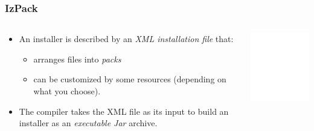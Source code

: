 \documentclass[compress,10pt]{beamer}
\begin{document}
\begin{frame}

\frametitle{IzPack}

\begin{columns}

  \begin{column}{6.5cm}
  \begin{itemize}

    \item An installer is described by an \textsl{XML installation file} that:
      \begin{itemize}
        \item arranges files into \textsl{packs}
        \item can be customized by some resources (depending on what you choose).
      \end{itemize}

    \item The compiler takes the XML file as its input to build an installer as
    an \textsl{executable Jar} archive.

  \end{itemize}
  \end{column}

  \begin{column}{4cm}
  \includegraphics[width=4cm,angle=270]{izpack-overview}
  \end{column}

\end{columns}

\end{frame}

\end{document}
